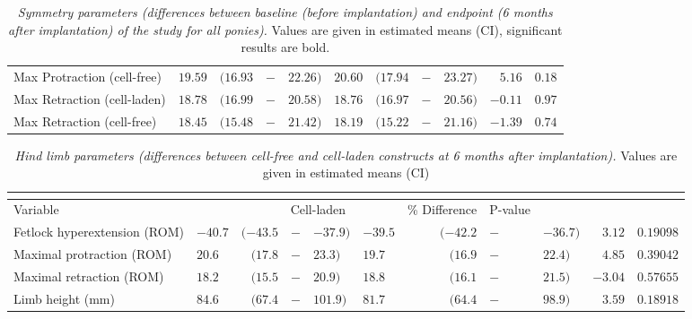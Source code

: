 \documentclass[twocolumn, serif, empirical, authordate, seplic]{jote-article}
\begin{document}
\begin{table}[ht!]
\begin{tabularx}{\linewidth}{>{\raggedright}p{}>{\raggedleft\arraybackslash}Xrp{}l>{\raggedleft\arraybackslash}Xrp{}lrr}
Max Protraction (cell-free) & $ 19.59$ & $ (16.93$ & $-$ & $22.26)  $& $ 20.60$ & $ (17.94$ & $-$ & $23.27)  $& $  5.16 $& $  0.18  $\tabularnewline 
Max Retraction (cell-laden) & $ 18.78$ & $ (16.99$ & $-$ & $20.58)  $& $ 18.76$ & $ (16.97$ & $-$ & $20.56)  $& $  -0.11 $& $  0.97  $\tabularnewline 
Max Retraction (cell-free) & $ 18.45$ & $ (15.48$ & $-$ & $21.42)  $& $ 18.19$ & $ (15.22$ & $-$ & $21.16)  $& $  -1.39 $& $  0.74  $\tabularnewline 
\bottomrule
\end{tabularx}
\caption{\emph{Symmetry parameters (differences between baseline (before implantation) and endpoint (6 months after implantation) of the study for all ponies).} Values are given in estimated means (CI), significant results are bold.}
\label{tab:table1}
\end{table}

\begin{table}[hb!]
\begin{tabularx}{\textwidth}{p{}>{\raggedleft\arraybackslash}Xrp{}l>{\raggedleft\arraybackslash}Xrp{}lrr}
  \multicolumn{11}{c}{\cellcolor[HTML]{ffffff}}\\[-2ex]
\toprule Variable & \multicolumn{4}{c}{Cell-free} & \multicolumn{4}{c}{Cell-laden} & \% Difference & P-value\tabularnewline \midrule  
Fetlock hyperextension (ROM) & $  -40.7$ & $ (-43.5$ & $-$ & $-37.9)  $& $  -39.5$ & $ (-42.2$ & $-$ & $-36.7)  $& $  3.12  $& $  0.19098 $\tabularnewline 
Maximal protraction (ROM) & $ 20.6$ & $ (17.8$ & $-$ & $23.3)  $& $ 19.7$ & $ (16.9$ & $-$ & $22.4)  $& $  4.85  $& $  0.39042 $\tabularnewline
Maximal retraction (ROM) & $ 18.2$& $ (15.5$ & $-$ & $20.9)  $& $ 18.8$ & $ (16.1$ & $-$ & $21.5)  $& $  -3.04  $& $  0.57655 $\tabularnewline
Limb height (mm) & $ 84.6$ & $ (67.4$ & $-$ & $101.9)  $& $ 81.7$ & $ (64.4$ & $-$ & $98.9)  $& $  3.59  $& $  0.18918 $\tabularnewline
\bottomrule \end{tabularx}
\caption{\emph{Hind limb parameters (differences between cell-free and cell-laden constructs at 6 months after implantation).
} Values are given in estimated means (CI)}
\label{tab:table2}
\end{table}
\end{document}
